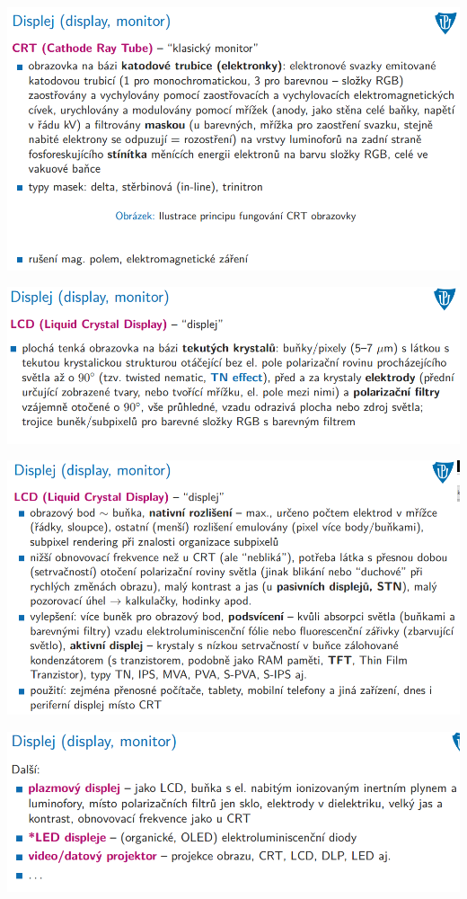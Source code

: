\documentclass[10pt,a4paper]{article}
\begin{document}
\includegraphics[scale=0.65]{img/prvni_odstavec/otazka7/periferie2.png}

\includegraphics[scale=0.65]{img/prvni_odstavec/otazka7/periferie3.png}

\includegraphics[scale=0.65]{img/prvni_odstavec/otazka7/periferie4.png}

\includegraphics[scale=0.65]{img/prvni_odstavec/otazka7/periferie5.png}
\end{document}
